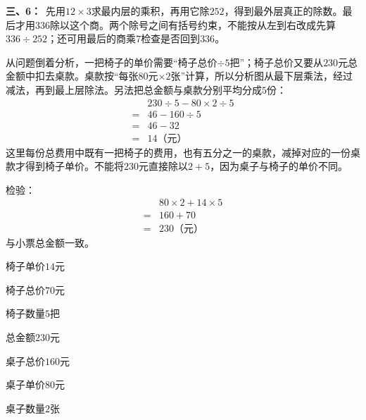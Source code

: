 \documentclass[multi=snippet,border=0pt]{standalone}
\newenvironment{snippet}[3]{\begin{minipage}{#1bp}\color{answerred}\fontsize{#2}{#3}\selectfont\raggedright}{\end{minipage}}
\begin{document}
\begin{snippet}{505}{11.5}{14}\textbf{三、6：}\ 先用\(12\times3\)求最内层的乘积，再用它除\(252\)，得到最外层真正的除数。最后才用\(336\)除以这个商。两个除号之间有括号约束，不能按从左到右改成先算\(336\div252\)；还可用最后的商乘\(7\)检查是否回到\(336\)。\end{snippet}
\begin{snippet}{505}{11.5}{14}从问题倒着分析，一把椅子的单价需要“椅子总价\(\div5\)把”；椅子总价又要从\(230\)元总金额中扣去桌款。桌款按“每张\(80\)元\(\times2\)张”计算，所以分析图从最下层乘法，经过减法，再到最上层除法。另法把总金额与桌款分别平均分成\(5\)份：\[\begin{aligned}&230\div5-80\times2\div5\\={}&46-160\div5\\={}&46-32\\={}&14\text{（元）}\end{aligned}\]这里每份总费用中既有一把椅子的费用，也有五分之一的桌款，减掉对应的一份桌款才得到椅子单价。不能将\(230\)元直接除以\(2+5\)，因为桌子与椅子的单价不同。\par 检验：\[\begin{aligned}&80\times2+14\times5\\={}&160+70\\={}&230\text{（元）}\end{aligned}\]与小票总金额一致。\end{snippet}
\begin{snippet}{72.04999999999995}{8.5}{12.8}椅子单价\(14\)元\end{snippet}
\begin{snippet}{71.79999999999995}{8.5}{12.8}椅子总价\(70\)元\end{snippet}
\begin{snippet}{71.79999999999995}{8.5}{12.8}椅子数量\(5\)把\end{snippet}
\begin{snippet}{72.29999999999995}{8.5}{12.8}总金额\(230\)元\end{snippet}
\begin{snippet}{72.04999999999995}{8.5}{12.8}桌子总价\(160\)元\end{snippet}
\begin{snippet}{72.29999999999995}{8.5}{12.8}桌子单价\(80\)元\end{snippet}
\begin{snippet}{71.29999999999995}{8.5}{12.8}桌子数量\(2\)张\end{snippet}
\end{document}
